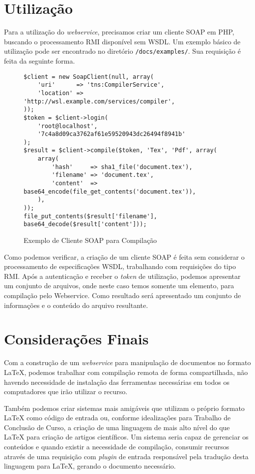 \documentclass{article}
\begin{document}
\section{Utilização}

Para a utilização do \emph{webservice}, precisamos criar um cliente SOAP em PHP,
buscando o processamento RMI disponível sem WSDL. Um exemplo básico de
utilização pode ser encontrado no diretório \texttt{/docs/examples/}. Sua
requisição é feita da seguinte forma.

\begin{figure}
\begin{lstlisting}
$client = new SoapClient(null, array(
    'uri'      => 'tns:CompilerService',
    'location' => 'http://wsl.example.com/services/compiler',
));
$token = $client->login(
    'root@localhost',
    '7c4a8d09ca3762af61e59520943dc26494f8941b'
);
$result = $client->compile($token, 'Tex', 'Pdf', array(
    array(
        'hash'     => sha1_file('document.tex'),
        'filename' => 'document.tex',
        'content'  => base64_encode(file_get_contents('document.tex')),
    ),
));
file_put_contents($result['filename'], base64_decode($result['content']));
\end{lstlisting}
\caption{Exemplo de Cliente SOAP para Compilação}
\end{figure}

Como podemos verificar, a criação de um cliente SOAP é feita sem considerar o
processamento de especificações WSDL, trabalhando com requisições do tipo RMI.
Após a autenticação e receber o \emph{token} de utilização, podemos apresentar
um conjunto de arquivos, onde neste caso temos somente um elemento, para
compilação pelo Webservice. Como resultado será apresentado um conjunto de
informações e o conteúdo do arquivo resultante.

\section{Considerações Finais}

Com a construção de um \emph{webservice} para manipulação de documentos no
formato \LaTeX{}, podemos trabalhar com compilação remota de forma
compartilhada, não havendo necessidade de instalação das ferramentas necessárias
em todos os computadores que irão utilizar o recurso.

Também podemos criar sistemas mais amigáveis que utilizam o próprio formato
\LaTeX{} como código de entrada ou, conforme idealizações para Trabalho de
Conclusão de Curso, a criação de uma linguagem de mais alto nível do que
\LaTeX{} para criação de artigos científicos. Um sistema seria capaz de
gerenciar os conteúdos e quando existir a necessidade de compilação, consumir
recursos através de uma requisição com \emph{plugin} de entrada responsável pela
tradução desta linguagem para \LaTeX{}, gerando o documento necessário.
\end{document}
